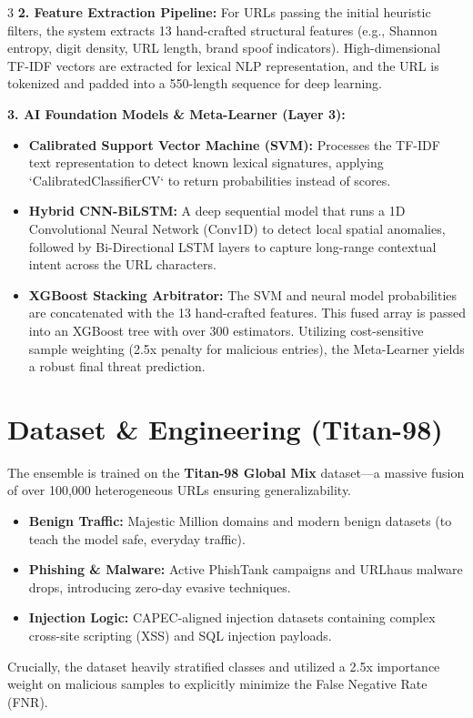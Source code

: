 \documentclass[a0,portrait,25pt]{a0poster}
\begin{document}
\begin{multicols}{3}
\textbf{2. Feature Extraction Pipeline:}
For URLs passing the initial heuristic filters, the system extracts 13 hand-crafted structural features (e.g., Shannon entropy, digit density, URL length, brand spoof indicators). High-dimensional TF-IDF vectors are extracted for lexical NLP representation, and the URL is tokenized and padded into a 550-length sequence for deep learning.

\textbf{3. AI Foundation Models \& Meta-Learner (Layer 3):}
\begin{itemize}
    \item \textbf{Calibrated Support Vector Machine (SVM):} Processes the TF-IDF text representation to detect known lexical signatures, applying `CalibratedClassifierCV` to return probabilities instead of scores.
    \item \textbf{Hybrid CNN-BiLSTM:} A deep sequential model that runs a 1D Convolutional Neural Network (Conv1D) to detect local spatial anomalies, followed by Bi-Directional LSTM layers to capture long-range contextual intent across the URL characters.
    \item \textbf{XGBoost Stacking Arbitrator:} The SVM and neural model probabilities are concatenated with the 13 hand-crafted features. This fused array is passed into an XGBoost tree with over 300 estimators. Utilizing cost-sensitive sample weighting (2.5x penalty for malicious entries), the Meta-Learner yields a robust final threat prediction.
\end{itemize}



\section*{Dataset \& Engineering (Titan-98)}
The ensemble is trained on the \textbf{Titan-98 Global Mix} dataset—a massive fusion of over 100,000 heterogeneous URLs ensuring generalizability.
\begin{itemize}
    \item \textbf{Benign Traffic:} Majestic Million domains and modern benign datasets (to teach the model safe, everyday traffic).
    \item \textbf{Phishing \& Malware:} Active PhishTank campaigns and URLhaus malware drops, introducing zero-day evasive techniques.
    \item \textbf{Injection Logic:} CAPEC-aligned injection datasets containing complex cross-site scripting (XSS) and SQL injection payloads.
\end{itemize}
Crucially, the dataset heavily stratified classes and utilized a 2.5x importance weight on malicious samples to explicitly minimize the False Negative Rate (FNR).


\end{multicols}
\end{document}
